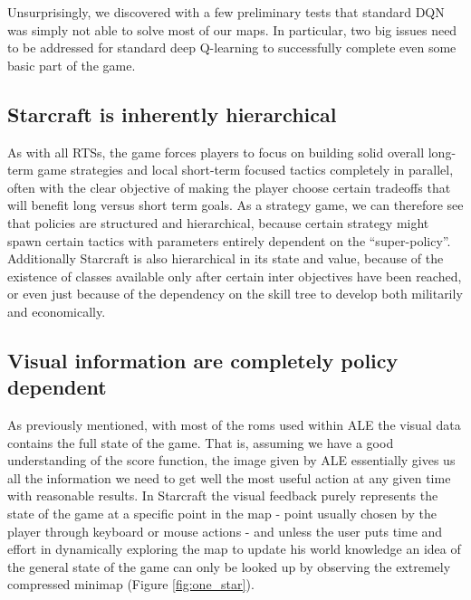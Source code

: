 \documentclass[bsc,frontabs,twoside,singlespacing,parskip,deptreport]{infthesis}     %
\begin{document}
Unsurprisingly, we discovered with a few preliminary tests that standard DQN was
simply not able to solve most of our maps. In particular, two big issues need to
be addressed for standard deep Q-learning to successfully complete even some
basic part of the game.

\subsection{Starcraft is inherently hierarchical}

As with all RTSs, the game forces players to focus on building solid overall
long-term game strategies and local short-term focused tactics completely in
parallel, often with the clear objective of making the player choose certain
tradeoffs that will benefit long versus short term goals. As a strategy game, we
can therefore see that policies are structured and hierarchical, because certain
strategy might spawn certain tactics with parameters entirely dependent on the
``super-policy''. Additionally Starcraft is also hierarchical in its state and
value, because of the existence of classes available only after certain inter
objectives have been reached, or even just because of the dependency on the
skill tree to develop both militarily and economically.

\subsection{Visual information are completely policy dependent}

As previously mentioned, with most of the roms used within ALE the visual data
contains the full state of the game. That is, assuming we have a good
understanding of the score function, the image given by ALE essentially gives us
all the information we need to get well the most useful action at any given time
with reasonable results. In Starcraft the visual feedback purely represents the
state of the game at a specific point in the map - point usually chosen by the
player through keyboard or mouse actions - and unless the user puts time and
effort in dynamically exploring the map to update his world knowledge an idea of
the general state of the game can only be looked up by observing the extremely
compressed minimap (Figure \ref{fig:one_star}).
\end{document}
